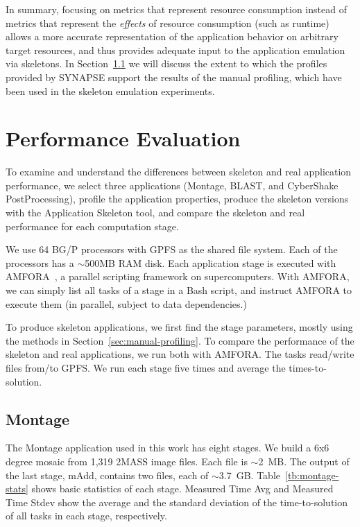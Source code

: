 \documentclass[preprint,12pt]{elsarticle}
\newcommand{\amnote}[1]{{\textcolor{magenta}    { ***Andre: #1 }}}
\newcommand{\amnote}[1]{}
\newcommand{\I}[1]{\textit{#1}\xspace}
\begin{document}
In summary, focusing on metrics that represent resource consumption
instead of metrics that represent the \I{effects} of resource
consumption (such as runtime) allows a more accurate representation of
the application behavior on arbitrary target resources, and thus
provides adequate input to the application emulation via skeletons.
In Section~\ref{sec:Montage} we will discuss the extent to which the
profiles provided by SYNAPSE support the results of the manual
profiling, which have been used in the skeleton emulation experiments.


\section{Performance Evaluation}
\label{lb:Perf}
To examine and understand the differences between skeleton and real application performance, 
we select three applications (Montage, BLAST, and CyberShake PostProcessing), profile the application properties, 
produce the skeleton versions with the Application Skeleton tool, and compare the skeleton and real 
performance for each computation stage.

We use 64 BG/P processors with GPFS as the shared file system. Each of the processors has a $\sim$500MB
RAM disk. Each application stage is executed with AMFORA~\cite{AMFS2013}, a parallel scripting framework on supercomputers.
With AMFORA, we can simply list all tasks of a stage in a Bash script, and instruct AMFORA to execute them (in parallel, subject to data dependencies.)

To produce skeleton applications, we first find the stage parameters,
mostly using the methods in Section~\ref{sec:manual-profiling}.
% 
To compare the performance of the skeleton and real applications, we run both with AMFORA. The tasks read/write files from/to GPFS.
We run each stage five times and average the times-to-solution.

\subsection{Montage}\label{sec:Montage}

The Montage application used in this work has eight stages. We build a 6x6 degree mosaic from 1,319 2MASS image files. Each file is $\sim$2~MB. The output of the last stage, mAdd, contains
two files, each of $\sim$3.7~GB. 
Table~\ref{tb:montage-stats} shows basic statistics of each stage. 
Measured Time Avg and Measured Time Stdev show the average and the standard deviation of the time-to-solution of all tasks in each stage, respectively.
\end{document}
